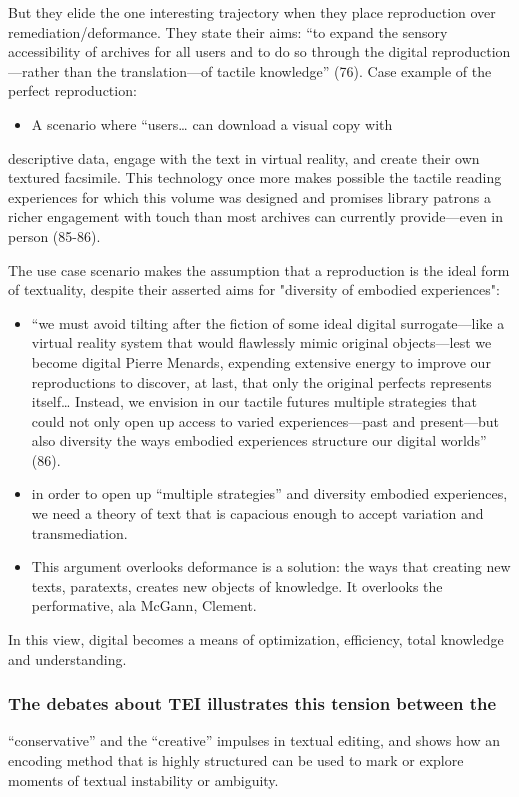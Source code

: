 \documentclass[11pt]{article}
\begin{document}
But they elide the one interesting trajectory when they place
reproduction over remediation/deformance. They state their aims: “to
expand the sensory accessibility of archives for all users and to do
so through the digital reproduction---rather than the translation---of
tactile knowledge” (76). Case example of the perfect reproduction:
\begin{itemize}
\item A scenario where “users\ldots{} can download a visual copy with
\end{itemize}
descriptive data, engage with the text in virtual reality, and create
their own textured facsimile. This technology once more makes possible
the tactile reading experiences for which this volume was designed and
promises library patrons a richer engagement with touch than most
archives can currently provide---even in person (85-86). 

The use case scenario makes the assumption that a reproduction is the
ideal form of textuality, despite their asserted aims for "diversity
of embodied experiences":
\begin{itemize}
\item “we must avoid tilting after the fiction of some ideal digital
surrogate---like a virtual reality system that would flawlessly
mimic original objects---lest we become digital Pierre Menards,
expending extensive energy to improve our reproductions to discover,
at last, that only the original perfects represents itself… Instead,
we envision in our tactile futures multiple strategies that could
not only open up access to varied experiences---past and
present---but also diversity the ways embodied experiences structure
our digital worlds” (86).
\item in order to open up “multiple strategies” and diversity embodied
experiences, we need a theory of text that is capacious enough to
accept variation and transmediation.
\item This argument overlooks deformance is a solution: the ways that
creating new texts, paratexts, creates new objects of knowledge. It
overlooks the performative, ala McGann, Clement.
\end{itemize}

In this view, digital becomes a means of optimization, efficiency,
total knowledge and understanding.

\subsubsection{The debates about TEI illustrates this tension between the}
\label{sec:org119324c}
“conservative” and the “creative” impulses in textual editing, and
shows how an encoding method that is highly structured can be used to
mark or explore moments of textual instability or ambiguity.
\end{document}
